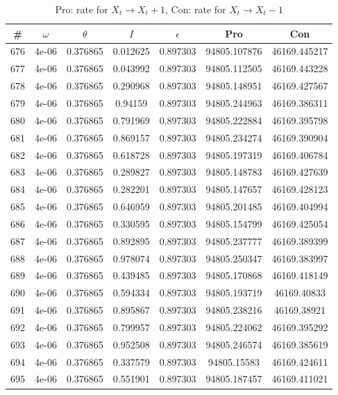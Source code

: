\newpage
\begin{table}
\caption{Pro: rate for $X_t \rightarrow X_t + 1$, Con: rate for $X_t \rightarrow X_t - 1$}
\begin{tabular*}{\linewidth}{c|c|c|c|c|c|c}
\# & $\omega$ & $\theta$ & $I$ & $\epsilon$ & Pro & Con \\
\hline
676 & 4e-06 & 0.376865 & 0.012625 & 0.897303 & 94805.107876 & 46169.445217\\
677 & 4e-06 & 0.376865 & 0.043992 & 0.897303 & 94805.112505 & 46169.443228\\
678 & 4e-06 & 0.376865 & 0.290968 & 0.897303 & 94805.148951 & 46169.427567\\
679 & 4e-06 & 0.376865 & 0.94159 & 0.897303 & 94805.244963 & 46169.386311\\
680 & 4e-06 & 0.376865 & 0.791969 & 0.897303 & 94805.222884 & 46169.395798\\
681 & 4e-06 & 0.376865 & 0.869157 & 0.897303 & 94805.234274 & 46169.390904\\
682 & 4e-06 & 0.376865 & 0.618728 & 0.897303 & 94805.197319 & 46169.406784\\
683 & 4e-06 & 0.376865 & 0.289827 & 0.897303 & 94805.148783 & 46169.427639\\
684 & 4e-06 & 0.376865 & 0.282201 & 0.897303 & 94805.147657 & 46169.428123\\
685 & 4e-06 & 0.376865 & 0.646959 & 0.897303 & 94805.201485 & 46169.404994\\
686 & 4e-06 & 0.376865 & 0.330595 & 0.897303 & 94805.154799 & 46169.425054\\
687 & 4e-06 & 0.376865 & 0.892895 & 0.897303 & 94805.237777 & 46169.389399\\
688 & 4e-06 & 0.376865 & 0.978074 & 0.897303 & 94805.250347 & 46169.383997\\
689 & 4e-06 & 0.376865 & 0.439485 & 0.897303 & 94805.170868 & 46169.418149\\
690 & 4e-06 & 0.376865 & 0.594334 & 0.897303 & 94805.193719 & 46169.40833\\
691 & 4e-06 & 0.376865 & 0.895867 & 0.897303 & 94805.238216 & 46169.38921\\
692 & 4e-06 & 0.376865 & 0.799957 & 0.897303 & 94805.224062 & 46169.395292\\
693 & 4e-06 & 0.376865 & 0.952508 & 0.897303 & 94805.246574 & 46169.385619\\
694 & 4e-06 & 0.376865 & 0.337579 & 0.897303 & 94805.15583 & 46169.424611\\
695 & 4e-06 & 0.376865 & 0.551901 & 0.897303 & 94805.187457 & 46169.411021\\

\end{tabular*}
\end{table}
